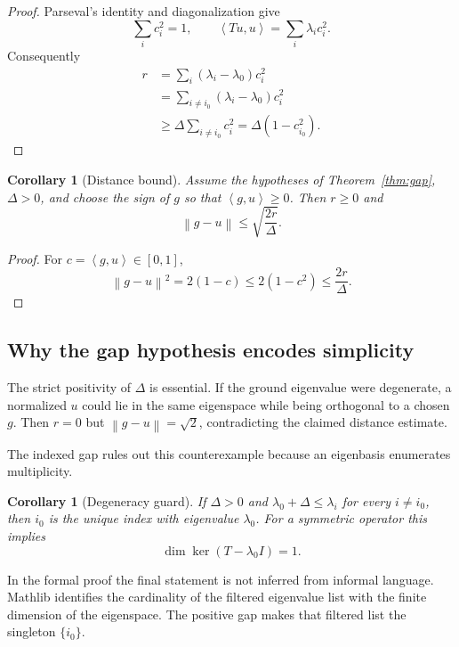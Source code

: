 \documentclass[11pt]{article}
\newtheorem{corollary}[theorem]{Corollary}
\theoremstyle{definition}
\newcommand{\ip}[2]{\left\langle #1,#2\right\rangle}
\newcommand{\norm}[1]{\left\lVert #1\right\rVert}
\begin{document}
\begin{proof}
Parseval's identity and diagonalization give
\[
 \sum_i c_i^2=1,
 \qquad
 \ip{Tu}{u}=\sum_i\lambda_i c_i^2.
\]
Consequently
\begin{align*}
 r
 &=\sum_i(\lambda_i-\lambda_0)c_i^2\\
 &=\sum_{i\neq i_0}(\lambda_i-\lambda_0)c_i^2\\
 &\geq \Delta\sum_{i\neq i_0}c_i^2
 =\Delta(1-c_{i_0}^2).
\end{align*}
\end{proof}

\begin{corollary}[Distance bound]\label{cor:distance}
Assume the hypotheses of Theorem~\ref{thm:gap}, $\Delta>0$, and choose the
sign of $g$ so that $\ip{g}{u}\geq0$.  Then $r\geq0$ and
\[
 \norm{g-u}\leq\sqrt{\frac{2r}{\Delta}}.
\]
\end{corollary}

\begin{proof}
For $c=\ip{g}{u}\in[0,1]$,
\[
 \norm{g-u}^2=2(1-c)\leq2(1-c^2)\leq\frac{2r}{\Delta}.
\]
\end{proof}

\subsection{Why the gap hypothesis encodes simplicity}

The strict positivity of $\Delta$ is essential.  If the ground eigenvalue
were degenerate, a normalized $u$ could lie in the same eigenspace while being
orthogonal to a chosen $g$.  Then $r=0$ but $\norm{g-u}=\sqrt2$, contradicting
the claimed distance estimate.

The indexed gap rules out this counterexample because an eigenbasis enumerates
multiplicity.

\begin{corollary}[Degeneracy guard]\label{cor:simple}
If $\Delta>0$ and
$\lambda_0+\Delta\leq\lambda_i$ for every $i\neq i_0$, then $i_0$ is the
unique index with eigenvalue $\lambda_0$.  For a symmetric operator this
implies
\[
 \dim\ker(T-\lambda_0 I)=1.
\]
\end{corollary}

In the formal proof the final statement is not inferred from informal
language.  Mathlib identifies the cardinality of the filtered eigenvalue list
with the finite dimension of the eigenspace.  The positive gap makes that
filtered list the singleton $\{i_0\}$.
\end{document}
